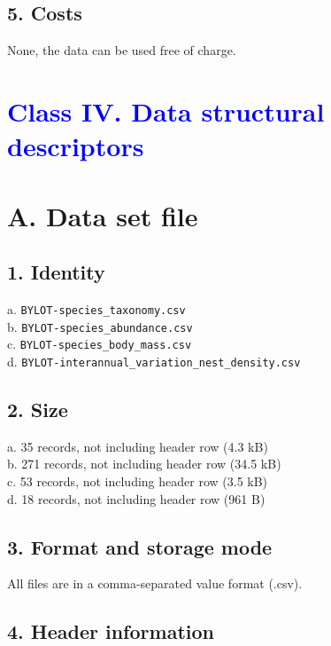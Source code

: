 \documentclass[a4paper,twoside,12pt]{article}
\begin{document}
                \subsection*{5. Costs}
                None, the data can be used free of charge.          
\newpage
    
 \section*{\textcolor{Blue}{Class IV. Data structural descriptors}}
    \section*{A. Data set file}
                        \subsection*{1. Identity} 
                        a. \texttt{BYLOT-species\_taxonomy.csv}\\
                b. \texttt{BYLOT-species\_abundance.csv}\\
                c. \texttt{BYLOT-species\_body\_mass.csv}\\
                        d. \texttt{BYLOT-interannual\_variation\_nest\_density.csv}\\ 
                        
                        \subsection*{2. Size} 
                        a. 35 records, not including header row (4.3 kB)\\
                        b. 271 records, not including header row  (34.5 kB)\\
                        c. 53 records, not including header row  (3.5 kB)\\
                        d. 18 records, not including header row  (961 B)
                        
                        \subsection*{3. Format and storage mode} All files are in a comma-separated value format (.csv). 
      
                        \subsection*{4. Header information} 
\end{document}
